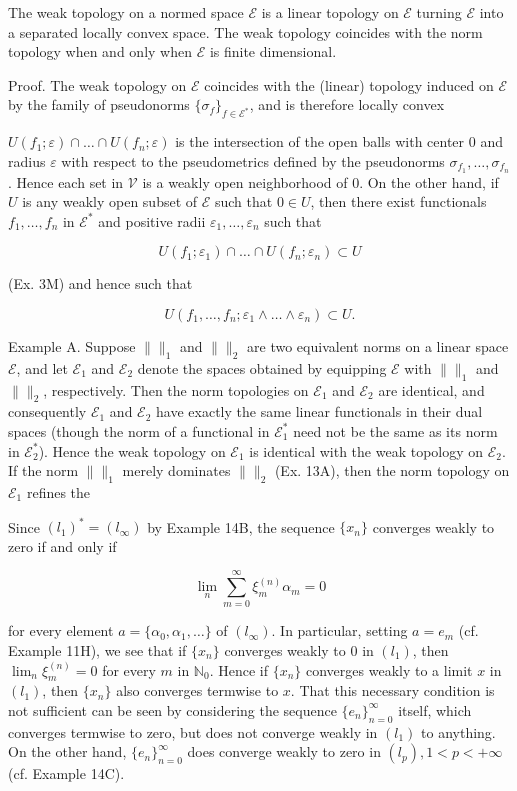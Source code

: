 The weak topology on a normed space $\mathcal{E}$ is a linear topology on $\mathcal{E}$ turning $\mathcal{E}$ into a separated locally convex space. The weak topology coincides with the norm topology when and only when $\mathcal{E}$ is finite dimensional.

Proof. The weak topology on $\mathcal{E}$ coincides with the (linear) topology induced on $\mathcal{E}$ by the family of pseudonorms $\{\sigma_f\}_{f \in \mathcal{E}^*}$, and is therefore locally convex

$U(f_1; \varepsilon) \cap \dots \cap U(f_n; \varepsilon)$ is the intersection of the open balls with center 0 and radius $\varepsilon$ with respect to the pseudometrics defined by the pseudonorms $\sigma_{f_1}, \dots, \sigma_{f_n}$. Hence each set in $\mathcal{V}$ is a weakly open neighborhood of 0. On the other hand, if $U$ is any weakly open subset of $\mathcal{E}$ such that $0 \in U$, then there exist functionals $f_1, \dots, f_n$ in $\mathcal{E}^*$ and positive radii $\varepsilon_1, \dots, \varepsilon_n$ such that

$$U(f_1; \varepsilon_1) \cap \dots \cap U(f_n; \varepsilon_n) \subset U$$

(Ex. 3M) and hence such that

$$U(f_1, \dots, f_n; \varepsilon_1 \wedge \dots \wedge \varepsilon_n) \subset U.$$

Example A. Suppose $\parallel \parallel_1$ and $\parallel \parallel_2$ are two equivalent norms on a linear space $\mathcal{E}$, and let $\mathcal{E}_1$ and $\mathcal{E}_2$ denote the spaces obtained by equipping $\mathcal{E}$ with $\parallel \parallel_1$ and $\parallel \parallel_2$, respectively. Then the norm topologies on $\mathcal{E}_1$ and $\mathcal{E}_2$ are identical, and consequently $\mathcal{E}_1$ and $\mathcal{E}_2$ have exactly the same linear functionals in their dual spaces (though the norm of a functional in $\mathcal{E}_1^*$ need not be the same as its norm in $\mathcal{E}_2^*$). Hence the weak topology on $\mathcal{E}_1$ is identical with the weak topology on $\mathcal{E}_2$. If the norm $\parallel \parallel_1$ merely dominates $\parallel \parallel_2$ (Ex. 13A), then the norm topology on $\mathcal{E}_1$ refines the

Since $(l_1)^* = (l_\infty)$ by Example 14B, the sequence $\{x_n\}$ converges weakly to zero if and only if

$$\lim_{n} \sum_{m=0}^{\infty} \xi_m^{(n)} \alpha_m = 0$$

for every element $a = \{\alpha_0, \alpha_1, \ldots\}$ of $(l_\infty)$. In particular, setting $a = e_m$ (cf. Example 11H), we see that if $\{x_n\}$ converges weakly to 0 in $(l_1)$, then $\lim_{n} \xi_m^{(n)} = 0$ for every $m$ in $\mathbb{N}_0$. Hence if $\{x_n\}$ converges weakly to a limit $x$ in $(l_1)$, then $\{x_n\}$ also converges termwise to $x$. That this necessary condition is not sufficient can be seen by considering the sequence $\{e_n\}_{n=0}^{\infty}$ itself, which converges termwise to zero, but does not converge weakly in $(l_1)$ to anything. On the other hand, $\{e_n\}_{n=0}^{\infty}$ does converge weakly to zero in $(l_p), 1 < p < +\infty$ (cf. Example 14C).

